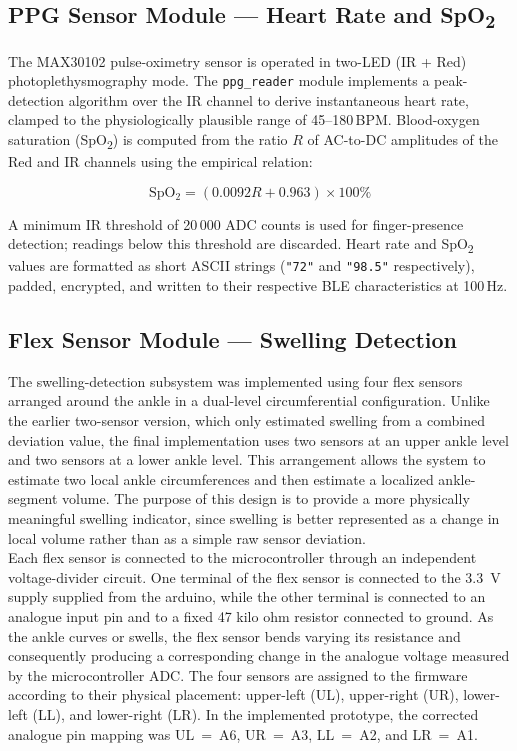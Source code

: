 \subsection{PPG Sensor Module — Heart Rate and SpO\textsubscript{2}}
\label{subsec:fw_ppg}

\noindent The MAX30102 pulse-oximetry sensor is operated in two-LED (IR + Red) photoplethysmography mode.
The \texttt{ppg\_reader} module implements a peak-detection algorithm over the IR channel to
derive instantaneous heart rate, clamped to the physiologically plausible range of 45–180\,BPM.
Blood-oxygen saturation (SpO\textsubscript{2}) is computed from the ratio $R$ of AC-to-DC
amplitudes of the Red and IR channels using the empirical relation:

\begin{equation}
  \mathrm{SpO_2} = (0.0092R + 0.963) \times 100\%
  \label{eq:spo2}
\end{equation}

\noindent A minimum IR threshold of 20\,000 ADC counts is used for finger-presence detection; readings
below this threshold are discarded.  Heart rate and SpO\textsubscript{2} values are formatted as
short ASCII strings (\texttt{"72"} and \texttt{"98.5"} respectively), padded, encrypted, and
written to their respective BLE characteristics at 100\,Hz.

\subsection{Flex Sensor Module — Swelling Detection}
\label{subsec:fw_flex}
\noindent The swelling-detection subsystem was implemented using four flex sensors arranged around the ankle in a dual-level circumferential configuration. Unlike the earlier two-sensor version, %
which only estimated swelling from a combined deviation value, the final implementation uses two sensors at an upper ankle level and two sensors at a lower ankle level. This arrangement allows the system to estimate two local ankle circumferences and then estimate a localized ankle-segment volume. The purpose of this design is to provide a more physically meaningful swelling indicator, since swelling is better represented as a change in local volume rather than as a simple raw sensor deviation. \\


\noindent Each flex sensor is connected to the microcontroller through an independent voltage-divider circuit. One terminal of the flex sensor is connected to the 3.3~V supply supplied from the arduino, while the other terminal is connected to an analogue input pin and to a fixed 47 kilo ohm resistor connected to ground. As the ankle curves or swells, the flex sensor bends varying its resistance and consequently producing a corresponding change in the analogue voltage measured by the microcontroller ADC. The four sensors are assigned to the firmware according to their physical placement: upper-left (UL), upper-right (UR), lower-left (LL), and lower-right (LR). In the implemented prototype, the corrected analogue pin mapping was UL~=~A6, UR~=~A3, LL~=~A2, and LR~=~A1. \\


